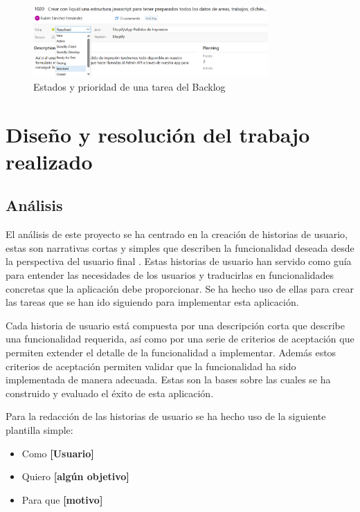 \documentclass[12pt]{article}
\begin{document}
\begin{figure}[ht]
    \centering
    \includegraphics[width=0.8\textwidth]{imagenes/Estados y prioridad de tarea.png}
    \caption{\label{fig:4}Estados y prioridad de una tarea del Backlog}
    \vspace{\fill}
\end{figure}


\clearpage
\section{Diseño y resolución del trabajo realizado}

\subsection{Análisis}
El análisis de este proyecto se ha centrado en la creación de historias de usuario, estas son narrativas 
cortas y simples que describen la funcionalidad deseada desde la perspectiva del usuario final \cite{hu}. 
Estas historias de usuario han servido como guía para entender las necesidades de los usuarios y traducirlas en 
funcionalidades concretas que la aplicación debe proporcionar. Se ha hecho uso de ellas para crear
las tareas que se han ido siguiendo para implementar esta aplicación.

Cada historia de usuario está compuesta por una descripción corta que describe una funcionalidad requerida, así como por una serie de criterios de aceptación que 
permiten extender el detalle de la funcionalidad a implementar. Además estos criterios de aceptación permiten validar que la funcionalidad 
ha sido implementada de manera adecuada. Estas son la bases sobre las cuales se ha construido y evaluado el éxito de esta aplicación.

Para la redacción de las historias de usuario se ha hecho uso de la siguiente plantilla simple:

\begin{itemize}
    \item Como \textbf{[Usuario]}
    \item Quiero \textbf{[algún objetivo]}
    \item Para que \textbf{[motivo]}
\end{itemize}
\end{document}
